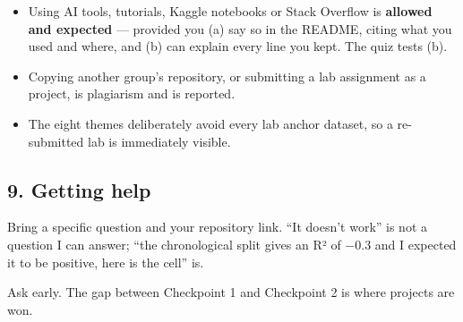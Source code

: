 \documentclass[11pt]{article}
\providecommand{\tightlist}{\setlength{\itemsep}{0pt}\setlength{\parskip}{0pt}}
\begin{document}
\begin{itemize}
\tightlist
\item
  Using AI tools, tutorials, Kaggle notebooks or Stack Overflow is \textbf{allowed and
  expected} --- provided you (a) say so in the README, citing what you used and
  where, and (b) can explain every line you kept. The quiz tests (b).
\item
  Copying another group's repository, or submitting a lab assignment as a project,
  is plagiarism and is reported.
\item
  The eight themes deliberately avoid every lab anchor dataset, so a re-submitted
  lab is immediately visible.
\end{itemize}



\hypertarget{getting-help}{%
\subsection{9. Getting help}\label{getting-help}}

Bring a specific question and your repository link. ``It doesn't work'' is not a
question I can answer; ``the chronological split gives an R² of −0.3 and I expected
it to be positive, here is the cell'' is.

Ask early. The gap between Checkpoint 1 and Checkpoint 2 is where projects are won.
\end{document}
